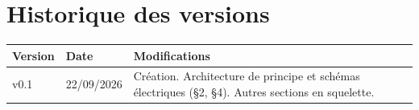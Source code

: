 \documentclass[11pt,a4paper]{article}
\newcommand{\docdate}{22/09/2026}
\begin{document}
\section{Historique des versions}
\begin{table}[H]
\centering\small
\begin{tabular}{llp{9cm}}
\toprule
\textbf{Version} & \textbf{Date} & \textbf{Modifications} \\
\midrule
v0.1 & \docdate & Création. Architecture de principe et schémas électriques (\S2, \S4).
Autres sections en squelette. \\
\bottomrule
\end{tabular}
\end{table}
\end{document}
